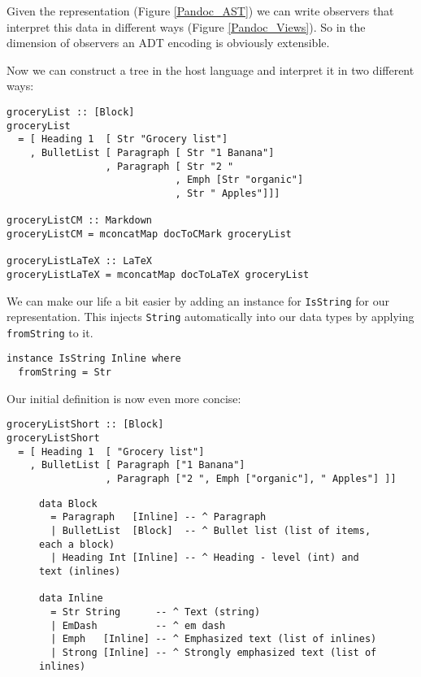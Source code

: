 Given the representation (Figure \ref{Pandoc_AST}) we can write observers that
interpret this data in different ways (Figure \ref{Pandoc_Views}). So in the
dimension of observers an ADT encoding is obviously extensible.

Now we can construct a tree in the host language and interpret it in two
different ways:
\begin{lstlisting}
groceryList :: [Block]
groceryList
  = [ Heading 1  [ Str "Grocery list"]
    , BulletList [ Paragraph [ Str "1 Banana"]
                 , Paragraph [ Str "2 "
                             , Emph [Str "organic"]
                             , Str " Apples"]]]

groceryListCM :: Markdown
groceryListCM = mconcatMap docToCMark groceryList

groceryListLaTeX :: LaTeX
groceryListLaTeX = mconcatMap docToLaTeX groceryList
\end{lstlisting}

We can make our life a bit easier by adding an instance for \texttt{IsString}
for our representation. This injects \texttt{String} automatically into our data
types by applying \texttt{fromString} to it.

\begin{lstlisting}
instance IsString Inline where
  fromString = Str
\end{lstlisting}


Our initial definition is now even more concise:

\begin{lstlisting}
groceryListShort :: [Block]
groceryListShort
  = [ Heading 1  [ "Grocery list"]
    , BulletList [ Paragraph ["1 Banana"]
                 , Paragraph ["2 ", Emph ["organic"], " Apples"] ]]
\end{lstlisting}

\begin{figure}
\begin{lstlisting}
data Block
  = Paragraph   [Inline] -- ^ Paragraph
  | BulletList  [Block]  -- ^ Bullet list (list of items, each a block)
  | Heading Int [Inline] -- ^ Heading - level (int) and text (inlines)
  
data Inline
  = Str String      -- ^ Text (string)
  | EmDash          -- ^ em dash
  | Emph   [Inline] -- ^ Emphasized text (list of inlines)
  | Strong [Inline] -- ^ Strongly emphasized text (list of inlines)
\end{lstlisting}
\end{figure}

